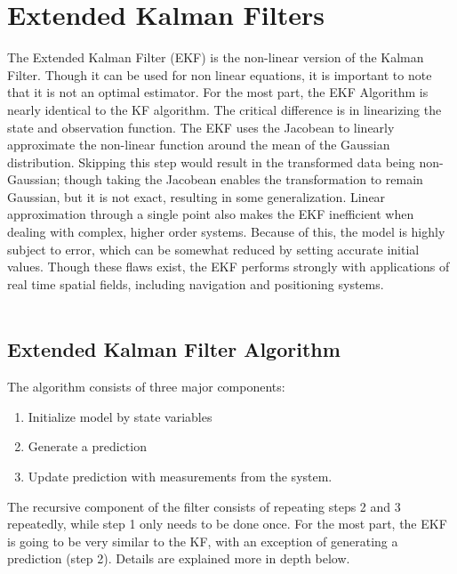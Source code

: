 \chapter{Extended Kalman Filters}
\label{Extended Kalman Filters}

The Extended Kalman Filter (EKF) is the non-linear version of the Kalman Filter. Though it can be used for non linear equations, it is important to note that it is not an optimal estimator. For the most part, the EKF Algorithm is nearly identical to the KF algorithm. The critical difference is in linearizing the state and observation function. The EKF uses the Jacobean to linearly approximate the non-linear function around the mean of the Gaussian distribution. Skipping this step would result in the transformed data being non-Gaussian; though taking the Jacobean enables the transformation to remain Gaussian, but it is not exact, resulting in some generalization. Linear approximation through a single point also makes the EKF inefficient when dealing with complex, higher order systems. Because of this, the model is highly subject to error, which can be somewhat reduced by setting accurate initial values. Though these flaws exist, the EKF performs strongly with applications of real time spatial fields, including navigation and positioning systems.  \\ \\

\section{Extended Kalman Filter Algorithm}

\noindent The algorithm consists of three major components:
\begin{enumerate}
  \item Initialize model by state variables
  \item Generate a prediction
  \item Update prediction with measurements from the system.
\end{enumerate}
The recursive component of the filter consists of repeating steps 2 and 3 repeatedly, while step 1 only needs to be done once. For the most part, the EKF is going to be very similar to the KF, with an exception of generating a prediction (step 2). Details are explained more in depth below.

